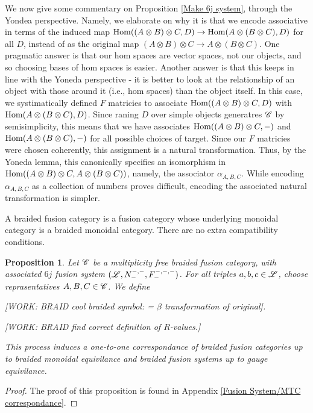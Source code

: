 \documentclass{article}
\newtheorem{proposition}{Proposition}[section]
\theoremstyle{definition}
\numberwithin{figure}{section}
\begin{document}
\begin{enumerate}[\thesection .1.]
We now give some commentary on Proposition \ref{Make 6j system}, through the Yondea perspective. Namely, we elaborate on why it is that we encode associative in terms of the induced map $\mathrm{Hom}((A\otimes B)\otimes C,D)\to \mathrm{Hom}(A\otimes (B\otimes C),D)$ for all $D$, instead of as the original map $(A\otimes B)\otimes C\to A\otimes (B\otimes C)$. One pragmatic answer is that our hom spaces are vector spaces, not our objects, and so choosing bases of hom spaces is easier. Another answer is that this keeps in line with the Yoneda perspective - it is better to look at the relationship of an object with those around it (i.e., hom spaces) than the object itself. In this case, we systimatically defined $F$ matricies to associate  $\mathrm{Hom}((A\otimes B)\otimes C,D)$ with $\mathrm{Hom}(A\otimes (B\otimes C),D)$. Since raning $D$ over simple objects generatres $\mathscr{C}$ by semisimplicity, this means that we have associates $\mathrm{Hom}((A\otimes B)\otimes C,\--)$ and $\mathrm{Hom}(A\otimes (B\otimes C),\--)$ for all possible choices of target. Since our $F$ matricies were chosen coherently, this assignment is a natural transformation. Thus, by the Yoneda lemma, this canonically specifies an isomorphism in $\mathrm{Hom}((A\otimes B)\otimes C,A\otimes (B\otimes C))$, namely, the associator $\alpha_{A,B,C}$. While encoding $\alpha_{A,B,C}$ as a collection of numbers proves difficult, encoding the associated natural transformation is simpler.

A braided fusion category is a fusion category whose underlying monoidal category is a braided monoidal category. There are no extra compatibility conditions.

\begin{proposition}\label{Make braided system} Let $\mathscr{C}$ be a multiplicity free braided fusion category, with associated $6j$ fusion system $(\mathscr{L},N^{\--,\--}_{\--},F^{\--,\--,\--}_{\--})$.  For all triples $a,b,c\in \mathscr{L}$, choose reprasentatives $A,B,C\in \mathscr{C}$. We define

[WORK: BRAID cool braided symbol: = $\beta$ transformation of original].

[WORK: BRAID find correct definition of $R$-values.]

This process induces a one-to-one correspondance of braided fusion categories up to braided monoidal equivilance and braided fusion systems up to gauge equivilance.
\end{proposition}
\begin{proof} The proof of this proposition is found in Appendix \ref{Fusion System/MTC correspondance}.
\end{proof}


\end{enumerate}
\end{document}
